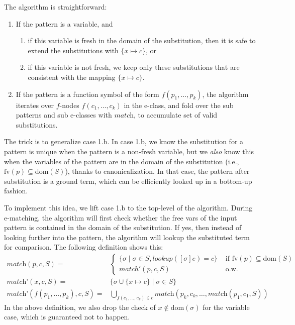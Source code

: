 The algorithm is straightforward:
\begin{enumerate}
\tightlist
\item
  If the pattern is a variable, and
  \begin{enumerate}
  \tightlist
  \item
    if this variable is fresh in the domain of the substitution, then
    it is safe to extend the substitutions with \(\{x\mapsto c\}\), or
  \item
    if this variable is not fresh, we keep only these substitutions that
    are consistent with the mapping \(\{x\mapsto c\}\).
  \end{enumerate}
\item
  If the pattern is a function symbol of the form \(f(p_1,\ldots,p_k)\),
  the algorithm iterates over \(f\)-nodes \(f(c_1,\ldots, c_k)\) in the
  e-class, and fold over the sub patterns and sub e-classes with
  \(\textit{match}\), to accumulate set of valid substitutions.
\end{enumerate}

The trick is to generalize case 1.b.
In case 1.b, we know the
 substitution for a pattern is unique when the pattern is a non-fresh
 variable, but we \emph{also} know this when the variables of the pattern
 are in the domain of the substitution (i.e.,
 \(\text{fv}(p)\subseteq\text{dom}(S)\)), thanks to canonicalization.
In that case, 
 the pattern after substitution is a ground term, 
 which can be efficiently looked up in a bottom-up fashion.

To implement this idea, we lift case 1.b to the top-level of the
 algorithm.
During e-matching, 
 the algorithm will first check whether the
 free vars of the input pattern is contained in the domain of the
 substitution.
If yes, 
 then instead of looking further into the pattern,
 the algorithm will lookup the substituted term for comparison.
The following definition shows this:
\begin{align*}
    \textit{match}(p, c, S) = & \begin{cases}
        \{\sigma \mid \sigma\in S, 
                      \textit{lookup}([\sigma]e)=c\} 
        &\text{ if $\text{fv}(p)\subseteq \text{dom}(S)$ }\\
        match'(p, c, S)&\text{ o.w.}
    \end{cases}\\
    \textit{match'}(x,c,S) = 
                   & \{ \sigma \cup \{ x \mapsto c\} \mid \sigma \in S\}\\
    \textit{match'}(f(p_{1}, \dots, p_{k}), c, S) = 
                   & \bigcup_{f(c_{1},\dots,c_{k})\in c}
                     \textit{match}(p_{k}, c_{k}, \dots, \textit{match}(p_{1}, c_{1}, S))
\end{align*}
In the above definition, we also drop the check of
\(x\not\in\text{dom}(\sigma)\) for the variable case, which is
guaranteed not to happen.

